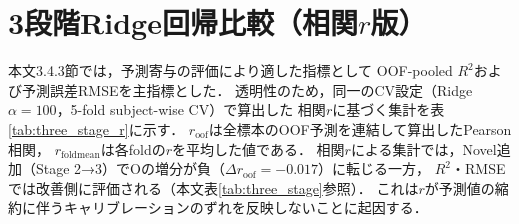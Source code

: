\documentclass[dvipdfmx,11pt,a4paper]{bxjsarticle}
\renewcommand{\_}{\paperorigunderscore\allowbreak}%
\begin{document}
\section{3段階Ridge回帰比較（相関$r$版）}
\label{sec:appendix_three_stage_r}


本文3.4.3節では，予測寄与の評価により適した指標として
OOF-pooled $R^2$および予測誤差RMSEを主指標とした．
透明性のため，同一のCV設定（Ridge $\alpha=100$，5-fold subject-wise CV）で算出した
相関$r$に基づく集計を表\ref{tab:three_stage_r}に示す．
$r_{\text{oof}}$は全標本のOOF予測を連結して算出したPearson相関，
$r_{\text{foldmean}}$は各foldの$r$を平均した値である．
相関$r$による集計では，Novel追加（Stage 2→3）でOの増分が負（$\Delta r_{\text{oof}} = -0.017$）に転じる一方，
$R^2$・RMSEでは改善側に評価される（本文表\ref{tab:three_stage}参照）．
これは$r$が予測値の縮約に伴うキャリブレーションのずれを反映しないことに起因する．

\begin{table}[htbp]
\centering
\caption{3段階Ridge回帰比較（相関$r$版・参考）．
$r_{\text{oof}}$はOOF予測連結によるPearson相関，
$r_{\text{foldmean}}$は5-fold平均，$\Delta r_{\text{oof}}$は隣接ステージ間の増分．}
\label{tab:three_stage_r}

\end{table}






\end{document}

